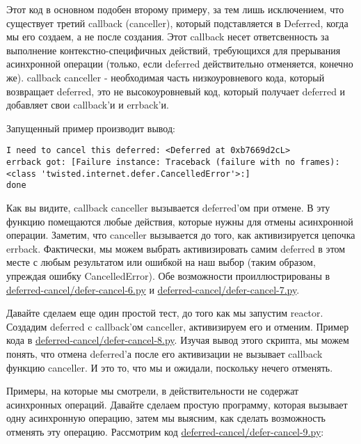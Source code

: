 Этот код в основном подобен второму примеру, 
за тем лишь исключением, что существует третий 
callback (canceller), который подставляется в Deferred, 
когда мы его создаем, а не после создания. Этот callback 
несет ответсвенность за выполнение контекстно-специфичных 
действий, требующихся для прерывания асинхронной операции (только, 
если deferred действительно отменяется, конечно же). callback 
canceller - необходимая часть низкоуровневого кода, 
который возвращает deferred, это не высокоуровневый код, 
который получает deferred и добавляет свои callback'и и errback'и.


Запущенный пример производит вывод:

 \begin{verbatim}
I need to cancel this deferred: <Deferred at 0xb7669d2cL>
errback got: [Failure instance: Traceback (failure with no frames): 
<class 'twisted.internet.defer.CancelledError'>:]
done
\end{verbatim} 


Как вы видите, callback canceller вызывается deferred'ом при
отмене. В эту функцию помещаются любые действия, которые 
нужны для отмены асинхронной операции. Заметим, что canceller 
вызывается до того, как активизируется цепочка errback. Фактически, 
мы можем выбрать активизировать самим deferred в этом месте с 
любым результатом или ошибкой на наш выбор (таким образом, 
упреждая ошибку CancelledError). Обе возможности проиллюстрированы 
в \href{http://github.com/jdavisp3/twisted-intro/blob/master/deferred-cancel/defer-cancel-6.py#L1}{deferred-cancel/defer-cancel-6.py} и 
\href{http://github.com/jdavisp3/twisted-intro/blob/master/deferred-cancel/defer-cancel-7.py#L1}{deferred-cancel/defer-cancel-7.py}.


Давайте сделаем еще один простой тест, до того как 
мы запустим reactor. Создадим deferred c callback'ом 
canceller, активизируем его и отменим. Пример кода в 
\href{http://github.com/jdavisp3/twisted-intro/blob/master/deferred-cancel/defer-cancel-8.py#L1}{deferred-cancel/defer-cancel-8.py}. Изучая вывод этого скрипта, мы можем 
понять, что отмена deferred'а после его активизации не 
вызывает callback функцию canceller. И это то, что мы и ожидали, 
поскольку нечего отменять.


Примеры, на которые мы смотрели, в действительности 
не содержат асинхронных операций. Давайте сделаем 
простую программу, которая вызывает одну асинхронную 
операцию, затем мы выясним, как сделать возможность 
отменять эту операцию. Рассмотрим код 
\href{http://github.com/jdavisp3/twisted-intro/blob/master/deferred-cancel/defer-cancel-9.py#L1}{deferred-cancel/defer-cancel-9.py}:

